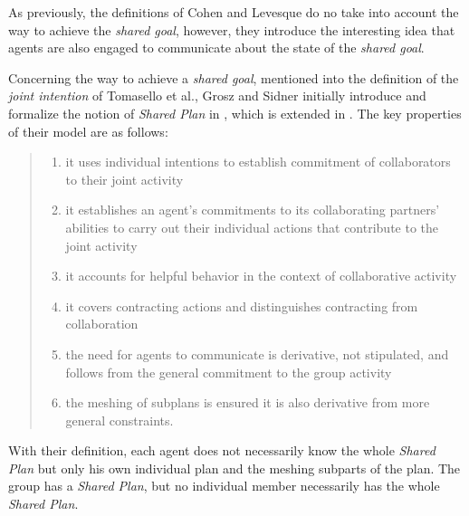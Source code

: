 \documentclass[english,a4paper,11pt,twoside]{StyleThese}
\begin{document}
As previously, the definitions of Cohen and Levesque do no take into account the way to achieve the \textit{shared goal}, however, they introduce the interesting idea that agents are also engaged to communicate about the state of the \textit{shared goal}.

Concerning the way to achieve a \textit{shared goal}, mentioned into the definition of the \textit{joint intention} of Tomasello et al., Grosz and Sidner initially introduce and formalize the notion of \textit{Shared Plan} in \cite{grosz1988plans}, which is extended in \cite{grosz1999evolution}. The key properties of their model are as follows:
\begin{quote}
\begin{enumerate}
\item it uses individual intentions to establish commitment of collaborators to their joint activity
\item it establishes an agent's commitments to its collaborating partners' abilities to carry out their
individual actions that contribute to the joint activity
\item it accounts for helpful behavior in the context of collaborative activity
\item it covers contracting actions and distinguishes contracting from collaboration
\item the need for agents to communicate is derivative, not stipulated, and follows from the general
commitment to the group activity
\item the meshing of subplans is ensured it is also derivative from more general constraints.
\end{enumerate}
\end{quote}

With their definition, each agent does not necessarily know the whole \textit{Shared Plan} but only his own individual plan and the meshing subparts of the plan. The group has a \textit{Shared Plan}, but no individual member necessarily has the whole \textit{Shared Plan}.
\end{document}
